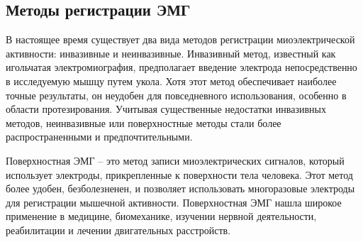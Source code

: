 \subsection{Методы регистрации ЭМГ}

В настоящее время существует два вида методов регистрации миоэлектрической активности: инвазивные и неинвазивные. Инвазивный метод, известный как игольчатая электромиография, предполагает введение электрода непосредственно в исследуемую мышцу путем укола. Хотя этот метод обеспечивает наиболее точные результаты, он неудобен для повседневного использования, особенно в области протезирования. Учитывая существенные недостатки инвазивных методов, неинвазивные или поверхностные методы стали более распространенными и предпочтительными.

Поверхностная ЭМГ – это метод записи миоэлектрических сигналов, который использует электроды, прикрепленные к поверхности тела человека. Этот метод более удобен, безболезненен, и позволяет использовать многоразовые электроды для регистрации мышечной активности. Поверхностная ЭМГ нашла широкое применение в медицине, биомеханике, изучении нервной деятельности, реабилитации и лечении двигательных расстройств.
